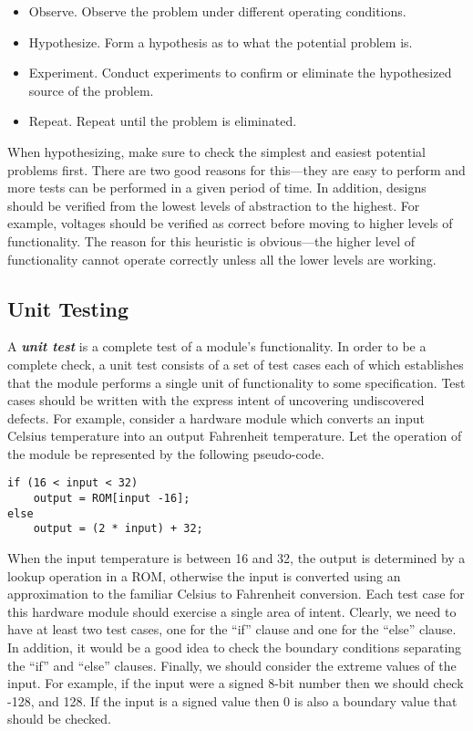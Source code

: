 \begin{itemize}
\item
  Observe. Observe the problem under different operating conditions.
\item
  Hypothesize. Form a hypothesis as to what the potential problem is.
\item
  Experiment. Conduct experiments to confirm or eliminate the
  hypothesized source of the problem.
\item
  Repeat. Repeat until the problem is eliminated.
\end{itemize}

When hypothesizing, make sure to check the simplest and easiest
potential problems first. There are two good reasons for this---they are
easy to perform and more tests can be performed in a given period of
time. In addition, designs should be verified from the lowest levels of
abstraction to the highest. For example, voltages should be verified as
correct before moving to higher levels of functionality. The reason for
this heuristic is obvious---the higher level of functionality cannot
operate correctly unless all the lower levels are working.

\subsection{Unit Testing}
\label{subsection:unit-testing}

A \emph{\textbf{unit test}} is a complete test of a module's
functionality. In order to be a complete check, a unit test consists of
a set of test cases each of which establishes that the module performs a
single unit of functionality to some specification. Test cases should be
written with the express intent of uncovering undiscovered defects. For
example, consider a hardware module which converts an input Celsius
temperature into an output Fahrenheit temperature. Let the operation of
the module be represented by the following pseudo-code.

\begin{center}
\begin{verbatim}
if (16 < input < 32)
    output = ROM[input -16];
else
    output = (2 * input) + 32;
\end{verbatim}
\end{center}

When the input temperature is between 16 and 32, the output is
determined by a lookup operation in a ROM, otherwise the input is
converted using an approximation to the familiar Celsius to Fahrenheit
conversion. Each test case for this hardware module should exercise a
single area of intent. Clearly, we need to have at least two test cases,
one for the ``if'' clause and one for the ``else'' clause. In addition,
it would be a good idea to check the boundary conditions separating the
``if'' and ``else'' clauses. Finally, we should consider the extreme
values of the input. For example, if the input were a signed 8-bit
number then we should check -128, and 128. If the input is a signed
value then 0 is also a boundary value that should be checked.

